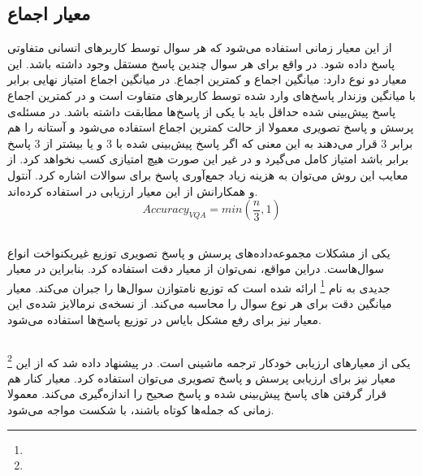 \subsection{معیار اجماع}

		از این معیار زمانی استفاده می‌شود که هر سوال توسط کاربرهای انسانی متفاوتی پاسخ داده شود. در واقع برای هر سوال چندین پاسخ مستقل وجود داشته باشد. این معیار دو نوع دارد: میانگین اجماع و کمترین اجماع. در میانگین اجماع امتیاز نهایی برابر با میانگین وزندار پاسخ‌های وارد شده توسط کاربرهای متفاوت است و در کمترین اجماع پاسخ پیش‌بینی شده حداقل باید با یکی از پاسخ‌ها مطابقت داشته باشد. در مسئله‌ی پرسش و پاسخ تصویری معمولا از حالت کمترین اجماع استفاده می‌شود و آستانه را هم برابر 3 قرار می‌دهند به این معنی که اگر پاسخ پیش‌بینی شده با 3 و یا بیشتر از 3 پاسخ برابر باشد امتیاز کامل می‌گیرد و در غیر این صورت هیچ امتیازی کسب نخواهد کرد. از معایب این روش می‌توان به هزینه زیاد جمع‌آوری پاسخ برای سوالات اشاره کرد. آنتول و همکارانش از این معیار ارزیابی در 
		\cite{antol2015vqa}
		استفاده کرده‌اند.
		\begin{equation}
			Accuracy_{VQA} = min(\frac{n}{3}, 1)
		\end{equation}

\subsection[\lr{MPT}]{\cite{kafle2017analysis}}

		یکی از مشکلات مجموعه‌داده‌های پرسش و پاسخ تصویری توزیع غیریکنواخت انواع سوال‌هاست. دراین مواقع، نمی‌توان از معیار دقت استفاده کرد. بنابراین  در 
	\cite{kafle2017analysis}
		 معیار جدیدی به نام 
	\footnote{}
		ارائه شده است که توزیع نامتوازن سوال‌ها را جبران می‌کند. معیار 
	میانگین دقت برای هر نوع سوال را محاسبه می‌کند. از نسخه‌ی نرمالایز شده‌ی این معیار نیز برای رفع مشکل بایاس در توزیع پاسخ‌ها استفاده می‌شود.


\subsection[\lr{BLEU}]{\cite{papineni2002bleu}}

		\footnote{}
		یکی از معیارهای ارزیابی خودکار ترجمه ماشینی است. در
		\cite{gurari2018vizwiz}
		 پیشنهاد داده شد که از این معیار نیز برای ارزیابی پرسش و پاسخ تصویری می‌توان استفاده کرد. معیار 
		کنار هم قرار گرفتن 
		های پاسخ پیش‌‌بینی شده و پاسخ صحیح را اندازه‌گیری می‌کند. معمولا
	زمانی که جمله‌ها کوتاه باشند، با شکست مواجه می‌‌شود.
		


